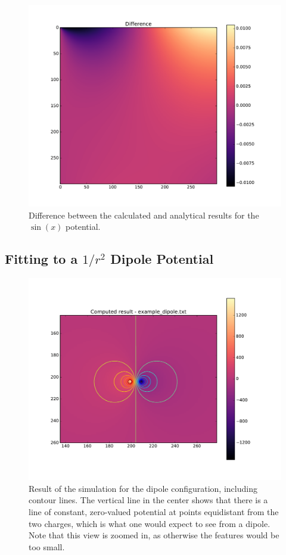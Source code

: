 	\begin{figure}[h]
	\centering
	\includegraphics[width=1.1\linewidth]{sin300_diff.pdf}
	\caption{Difference between the calculated and analytical results for the $\sin(x)$ potential.}
	\label{fig:sin-difference}
	\end{figure}

\subsection{Fitting to a $1/r^2$ Dipole Potential}
\begin{figure}[h!]
	\centering
	\center
	\includegraphics[width=1.0\linewidth]{dipole_contours.pdf}
	\caption[Result of the simulation for the dipole configuration, including contour lines.]{Result of the simulation for the dipole configuration, including contour lines. The vertical line in the center shows that there is a line of constant, zero-valued
	potential at points equidistant from the two charges, which is what one would expect to see from a dipole. Note that this view is zoomed in, as otherwise the features
	would be too small.} \label{fig:dipole-cont}
	\end{figure}



